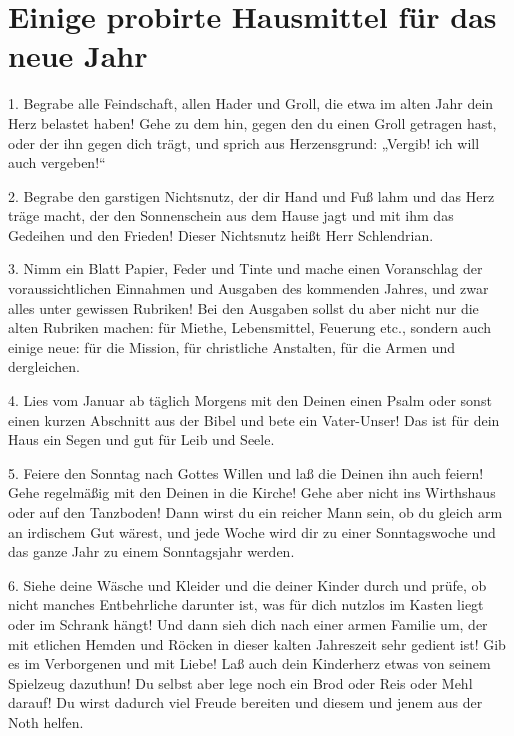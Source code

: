 \chapter[Probirte Hausmittel fürs neue Jahr]{Einige probirte Hausmittel für das neue Jahr}
1. Begrabe alle Feindschaft, allen Hader und Groll, die etwa im alten Jahr dein Herz belastet haben! Gehe zu dem hin, gegen den du einen Groll getragen hast, oder der ihn gegen dich trägt, und sprich aus Herzensgrund: „Vergib! ich will auch vergeben!“

2. Begrabe den garstigen Nichtsnutz, der dir Hand und Fuß lahm und das Herz träge macht, der den Sonnenschein aus dem Hause jagt und mit ihm das Gedeihen und den Frieden! Dieser Nichtsnutz heißt Herr Schlendrian.

3. Nimm ein Blatt Papier, Feder und Tinte und mache einen Voranschlag der voraussichtlichen Einnahmen und Ausgaben des kommenden Jahres, und zwar alles unter gewissen Rubriken! Bei den Ausgaben sollst du aber nicht nur die alten Rubriken machen: für Miethe, Lebensmittel, Feuerung etc., sondern auch einige neue: für die Mission, für christliche Anstalten, für die Armen und dergleichen.

4. Lies vom Januar ab täglich Morgens mit den Deinen einen Psalm oder sonst einen kurzen Abschnitt aus der Bibel und bete ein Vater-Unser! Das ist für dein Haus ein Segen und gut für Leib und Seele.

5. Feiere den Sonntag nach Gottes Willen und laß die Deinen ihn auch feiern! Gehe regelmäßig mit den Deinen in die Kirche! Gehe aber nicht ins Wirthshaus oder auf den Tanzboden! Dann wirst du ein reicher Mann sein, ob du gleich arm an irdischem Gut wärest, und jede Woche wird dir zu einer Sonntagswoche und das ganze Jahr zu einem Sonntagsjahr werden.

6. Siehe deine Wäsche und Kleider und die deiner Kinder durch und prüfe, ob nicht manches Entbehrliche darunter ist, was für dich nutzlos im Kasten liegt oder im Schrank hängt! Und dann sieh dich nach einer armen Familie um, der mit etlichen Hemden und Röcken in dieser kalten Jahreszeit sehr gedient ist! Gib es im Verborgenen und mit Liebe! Laß auch dein Kinderherz etwas von seinem Spielzeug dazuthun! Du selbst aber lege noch ein Brod oder Reis oder Mehl darauf! Du wirst dadurch viel Freude bereiten und diesem und jenem aus der Noth helfen.
